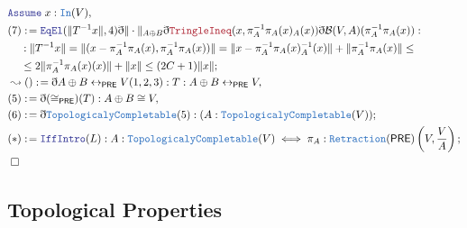 \documentclass[12pt]{scrartcl}
\newcommand{\TYPE}[1]{\textcolor{NavyBlue}{\mathtt{#1}}}
\newcommand{\LOGIC}[1]{\textcolor{Blue}{\mathtt{#1}}}
\newcommand{\THM}[1]{\textcolor{Maroon}{\mathtt{#1}}}
\renewcommand{\.}{\; . \;}
\newcommand{\de}{: \kern 0.1pc =}
\newcommand{\NewLine}{\\ & \kern 1pc}
\newcommand{\Page}[1]{\begin{align*} #1 \end{align*} \newpage   }
\newcommand{ \bd }{ \ByDef }
\newcommand{\ToBij}{\leftrightarrow}
\newcommand{\Say}[3]{& #1 \de #2 : #3, \\}
\newcommand{\Conclude}[3]{& #1 \de #2 : #3; \\}
\newcommand{\Derive}[3]{& \leadsto #1 \de #2 : #3, \\}
\newcommand{\A}{\LOGIC{Assume} \;}
\newcommand{\Assume}[2]{& \A #1 : #2, \\}
\newcommand{\QED}{\; \square}
\newcommand{\EndProof}{& \QED \\}
\newcommand{\ByDef}{\eth}
\newcommand{\PRE}{\mathsf{PRE}} %
\newcommand{\B}{\mathcal{B}}
\begin{document}
 \Page{
 \Assume{x}{\TYPE{In}(V)}
 \Conclude{(7)}{  \LOGIC{EqEl}( \| T^{-1}x \| , 4  ) \bd \| \cdot \|_{A \oplus B} 
  \bd \THM{TringleIneq}(x, \pi^{-1}_A \pi_A(x)_A(x) ) \bd \B(V,A)(\pi^{-1}_A \pi_A(x))}
 {  \NewLine : \| T^{-1}x \| = \| (x - \pi^{-1}_A \pi_A(x),\pi^{-1}_A \pi_A(x) ) \| = 
 \| x  -  \pi^{-1}_A \pi_A(x)^{-1}_A(x) \| + \| \pi^{-1}_A \pi_A(x) \| \le  
\NewLine \le 
   2\| \pi^{-1}_A \pi_A(x)(x) \| + \| x \| \le  (2C + 1)\| x\|}
 \Derive{()}{\bd A \oplus B \ToBij_\PRE  V (1,2,3)}{ T : A \oplus B \ToBij_\PRE  V} 
 \Say{(5)}{\bd (\cong_\PRE)(T)}{ A \oplus B \cong V}
 \Conclude{(6)}{ \bd \TYPE{TopologicalyCompletable}(5)   }{(A : \TYPE{TopologicalyCompletable}(V))} 
 \Conclude{(*)}{ \LOGIC{IffIntro}(L)}
 { A :  \TYPE{TopologicalyCompletable}(V) \iff  \pi_A : \TYPE{Retraction}(\PRE)\left(V, \frac{V}{A}\right) }
 \EndProof
} 
     \subsection{Topological Properties}
\end{document}
